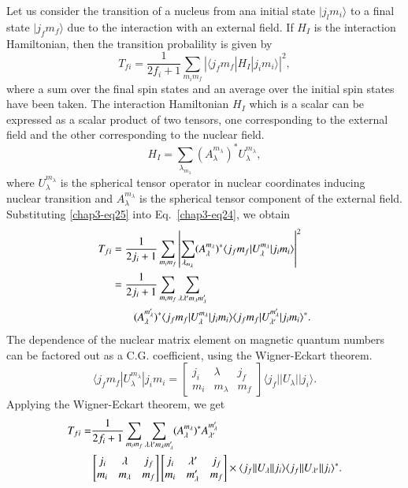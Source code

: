 Let us consider the transition of a nucleus from ana initial state $|j_l m_i \rangle$ to a final state $| j_f m_f \rangle$ due to the interaction with an external field. If $H_I$ is the interaction Hamiltonian, then the transition probalility is given by
\setcounter{equation}{23}
\begin{equation}
  T_{fi} = \frac{1}{2f_i +1} \sum_{m_i m_f} | \langle j_f m_f |H_I| j_i m_i \rangle |^2, \label{chap3-eq24}
\end{equation}
where a sum over the final spin states and an average over the initial spin states have been taken. The interaction Hamiltonian $H_I$ which is a scalar can be expressed as a scalar product of two tensors, one corresponding to the external field and the other corresponding to the nuclear field.
\begin{equation}
  H_I = \sum_{\lambda_{m_\lambda}} (A_\lambda^{m_\lambda})^\ast U_\lambda^{m_\lambda}, \label{chap3-eq25}
\end{equation}
where $U_\lambda^{m_\lambda}$ is the spherical tensor operator in nuclear coordinates inducing nuclear transition and $A_\lambda^{m_\lambda}$ is the spherical tensor component of the external field. Substituting \eqref{chap3-eq25} into Eq.\ \eqref{chap3-eq24}, we obtain
\begin{align}
  T_{fi} & = \frac{1}{2j_i +1} \sum_{m_im_f} \left| \sum_{\lambda_{m_\lambda}} (A_\lambda^{m_\lambda})^\ast \langle j_f m_f | U_\lambda^{m_\lambda}| j_i m_i \rangle \right|^2 \notag \\
  & = \frac{1}{2j_i +1} \sum_{m_i m_f} \sum_{\lambda \lambda' m_{\lambda} m_{\lambda}'} \notag \\
  & \qquad (A_{\lambda}^{m_\lambda'})^\ast \langle j_f m_f |U_\lambda^{m_\lambda} | j_i m_i \rangle \langle j_f m_f | U_{\lambda '}^{m_\lambda '}| j_i m_i \rangle^\ast. \label{chap3-eq26}
\end{align}
The dependence of the nuclear matrix element on magnetic quantum numbers can be factored out as a C.G. coefficient, using the Wigner-Eckart theorem.
\begin{equation}
  \langle j_f m_f | U_\lambda^{m_\lambda}| j_i m_i =
  \begin{bmatrix} j_i & \lambda & j_f\\ m_i & m_\lambda & m_f \end{bmatrix} \langle j_f || U_\lambda|| j_i \rangle . \label{chap3-eq27}
\end{equation}
Applying the Wigner-Eckart theorem, we get
\begin{align}
  T_{fi}  = & \frac{1}{2f_i+1} \sum_{m_i m_f} \sum_{\lambda \lambda' m_\lambda m_\lambda'} (A_\lambda^{m_\lambda})^\ast A_{\lambda'}^{m_\lambda'}
  \notag \\
 &  \begin{bmatrix} j_i & \lambda & j_f \\ m_i & m_\lambda & m_f\end{bmatrix}
    \begin{bmatrix} j_i & \lambda' & j_f \\ m_i & m_\lambda' & m_f\end{bmatrix}
      \times \langle j_f || U_\lambda || j_i \rangle \langle j_f || U_{\lambda'} || j_i \rangle^\ast. \label{chap3-eq28}
\end{align}
